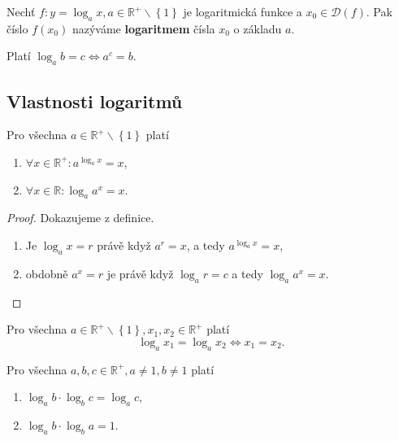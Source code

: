 \begin{definition}
    Nechť $f\colon  y=\log_a x, a \in \mathbb R^+ \smallsetminus \left \{ 1 \right \}$ je
    logaritmická funkce a $x_0\in \mathcal D(f).$ Pak číslo $f(x_0)$ nazýváme
    \textbf{logaritmem} čísla $x_0$ o základu $a.$
\end{definition}

\begin{pozn}
    Platí $\log_a b=c \iff a^c = b.$
\end{pozn}

\subsection*{Vlastnosti logaritmů}
\begin{veta}
    Pro všechna $a \in \mathbb R^+ \smallsetminus \left \{ 1 \right \}$ platí
    \begin{enumerate}[$i.$]
        \item $\forall x \in \mathbb R^+\colon a^{\log_a x}=x$,
       	\item $\forall x \in \mathbb R\colon \log_a a^x=x$.
    \end{enumerate}
\end{veta}

\begin{proof}
    Dokazujeme z definice.
    \begin{enumerate}[$i.$]
        \item Je $\log_a x = r$ právě když $a^r = x$, a tedy $a^{\log_a x}=x$,
       	\item obdobně $a^x = r$ je právě když $\log_a r=c$ a tedy $\log_a a^x = x$. \qedhere
    \end{enumerate}
\end{proof}

\begin{veta}\label{zakl_reseni}
    Pro všechna $a \in \mathbb R^+ \smallsetminus \left \{ 1 \right \},x_1, x_2\in \mathbb R^+$
   platí
  $$ \log_a x_1 = \log_a x_2 \iff x_1 = x_2.$$
\end{veta}

\begin{veta}
    Pro všechna $a,b,c\in \mathbb R^+, a\ne 1, b\ne 1$ platí
    \begin{enumerate}[$i.$]
        \item $\log_a b \cdot \log_b c = \log_a c,$
       	\item $\log_a b \cdot \log_b a = 1.$
    \end{enumerate}
\end{veta}

